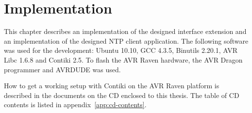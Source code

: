 
\chapter{Implementation}
This chapter describes an implementation of the designed interface extension
and an implementation of the designed NTP client application.
The following software was used for the development:
Ubuntu 10.10, GCC 4.3.5, Binutils 2.20.1, AVR Libc 1.6.8 and Contiki 2.5.
To flash the AVR Raven hardware, the AVR Dragon programmer and AVRDUDE %
was used.

How to get a working setup with Contiki on the AVR Raven platform is described in
the documents on the CD enclosed to this thesis.
The table of CD contents is listed in appendix~\ref{app:cd-contents}.








